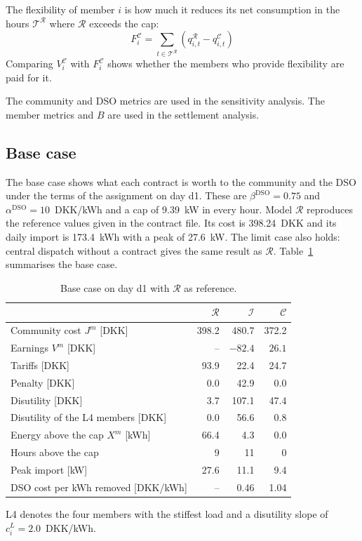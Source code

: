 The flexibility of member $i$ is how much it reduces its net consumption in the hours $\mathcal{T}^{\mathcal{R}}$ where $\mathcal{R}$ exceeds the cap:
\begin{equation}
    F_i^{\mathcal{C}} = \sum_{t \in \mathcal{T}^{\mathcal{R}}} \left(q_{i,t}^{\mathcal{R}} - q_{i,t}^{\mathcal{C}}\right)
    \label{eq:flexibility_member}
\end{equation}
Comparing $V_i^{\mathcal{C}}$ with $F_i^{\mathcal{C}}$ shows whether the members who provide flexibility are paid for it.

The community and DSO metrics are used in the sensitivity analysis. The member metrics and $B$ are used in the settlement analysis.

\subsection{Base case}
\label{basecase}
The base case shows what each contract is worth to the community and the DSO under the terms of the assignment on day d1.
These are $\beta^{\mathrm{DSO}}=0.75$ and $\alpha^{\mathrm{DSO}}=10$~DKK/kWh and a cap of 9.39~kW in every hour. Model $\mathcal{R}$ reproduces the reference values given in the contract file.
Its cost is 398.24~DKK and its daily import is 173.4~kWh with a peak of 27.6~kW.
The limit case also holds: central dispatch without a contract gives the same result as $\mathcal{R}$. 
Table~\ref{tab:base} summarises the base case.

\begin{table}[htbp]
\centering
\caption{Base case on day d1 with $\mathcal{R}$ as reference.}
\label{tab:base}
\small
\begin{tabular}{@{}lrrr@{}}
\toprule
 & $\mathcal{R}$ & $\mathcal{I}$ & $\mathcal{C}$\\
\midrule
Community cost $J^{m}$ [DKK] & 398.2 & 480.7 & 372.2\\
Earnings $V^{m}$ [DKK] & -- & $-82.4$ & $\mathbf{26.1}$\\
\midrule
Tariffs [DKK] & 93.9 & 22.4 & 24.7\\
Penalty [DKK] & 0.0 & 42.9 & 0.0\\
Disutility [DKK] & 3.7 & 107.1 & 47.4\\
Disutility of the L4 members [DKK] & 0.0 & 56.6 & 0.8\\
\midrule
Energy above the cap $X^{m}$ [kWh] & 66.4 & 4.3 & $\mathbf{0.0}$\\
Hours above the cap & 9 & 11 & 0\\
Peak import [kW] & 27.6 & 11.1 & 9.4\\
DSO cost per kWh removed [DKK/kWh] & -- & 0.46 & 1.04\\
\bottomrule
\end{tabular}

\vspace{3pt}
{\footnotesize L4 denotes the four members with the stiffest load and a disutility slope of $c^{L}_i=2.0$~DKK/kWh.}
\end{table}


